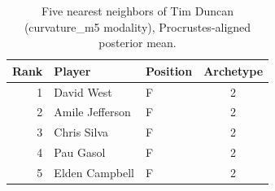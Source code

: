 \begin{table}[htbp]
  \centering\small
  \begin{tabular}{rllc}
    \toprule
    Rank & Player & Position & Archetype \\
    \midrule
    1 & David West & F & 2 \\
    2 & Amile Jefferson & F & 2 \\
    3 & Chris Silva & F & 2 \\
    4 & Pau Gasol & F & 2 \\
    5 & Elden Campbell & F & 2 \\
    \bottomrule
  \end{tabular}
  \caption{Five nearest neighbors of Tim Duncan (curvature_m5 modality), Procrustes-aligned posterior mean.}
  \label{tab:Tim_Duncan_neighbors_curvature_m5}
\end{table}

